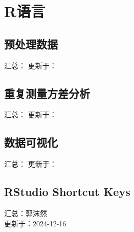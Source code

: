 \documentclass[]{ctexbook}
\theoremstyle{definition}
\theoremstyle{definition}
\theoremstyle{definition}
\theoremstyle{definition}
\theoremstyle{remark}
\begin{document}
\chapter{R语言}\label{r}

\section{预处理数据}\label{r-prepro}

汇总：
更新于：

\section{重复测量方差分析}\label{r-rm-anova}

汇总：
更新于：

\section{数据可视化}\label{r-plot}

汇总：
更新于：

\section{RStudio Shortcut Keys}\label{RStudioShortcutKeys}

汇总：郭沫然\\
更新于：2024-12-16
\end{document}
